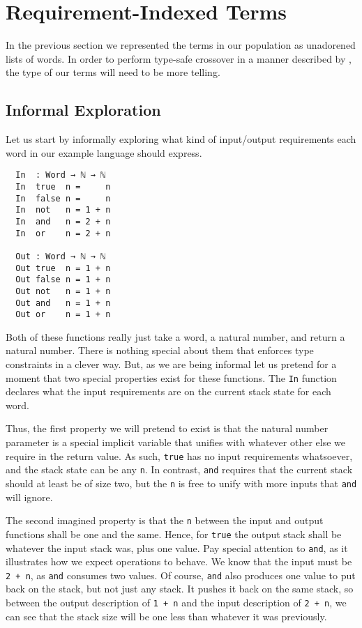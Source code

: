 \documentclass{acm_proc_article-sp}
\begin{document}
\section{Requirement-Indexed Terms}

In the previous section we represented the terms in our population as
unadorened lists of words. In order to perform type-safe crossover in
a manner described by \cite{tchernev:forthcross}, the type of our
terms will need to be more telling.

\subsection{Informal Exploration}

Let us start by informally exploring what kind of input/output
requirements each word in our example language should express. 

\begin{verbatim}
  In  : Word → ℕ → ℕ
  In  true  n =     n
  In  false n =     n
  In  not   n = 1 + n
  In  and   n = 2 + n
  In  or    n = 2 + n

  Out : Word → ℕ → ℕ
  Out true  n = 1 + n
  Out false n = 1 + n
  Out not   n = 1 + n
  Out and   n = 1 + n
  Out or    n = 1 + n
\end{verbatim}

Both of these functions really just take a word, a natural number, and
return a natural number. There is nothing special about them that
enforces type constraints in a clever way. But, as we are being
informal let us pretend for a moment that two special properties exist
for these functions. The \texttt{In} function declares what the input
requirements are on the current stack state for each word.

Thus, the first property we will pretend to exist is that the natural number
parameter is a special implicit variable that unifies with whatever
other else we require in the return value. As such, \texttt{true} has
no input requirements whatsoever, and the stack state can be any
\texttt{n}. In contrast, \texttt{and} requires that the current stack
should at least be of size two, but the \texttt{n} is free to unify
with more inputs that \texttt{and} will ignore.

The second imagined property is that the \texttt{n} between the input
and output functions shall be one and the same. Hence, for
\texttt{true} the output stack shall be whatever the input stack was,
plus one value. Pay special attention to \texttt{and}, as it
illustrates how we expect operations to behave. We know that the input
must be \texttt{2 + n}, as \texttt{and} consumes two values. Of
course, \texttt{and} also produces one value to put back on the
stack, but not just any stack. It pushes it back on the same stack, so
between the output description of \texttt{1 + n} and the input
description of \texttt{2 + n}, we can see that the stack size will be
one less than whatever it was previously.
\end{document}
